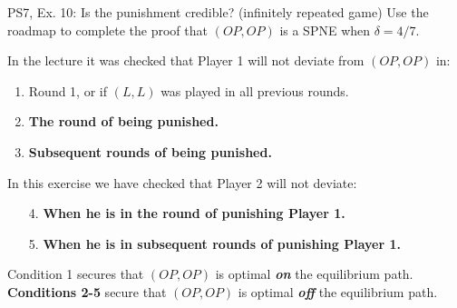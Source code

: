 \begin{frame}{PS7, Ex. 10: Is the punishment credible? (infinitely repeated game)}
  Use the roadmap to complete the proof that $(OP,OP)$ is a SPNE when $\delta=4/7$.\vspace{-4pt}
  \begin{multicols}{2}
    In the lecture it was checked that Player 1 will not deviate from $(OP,OP)$ in:
    \begin{enumerate}
      \item Round 1, or if $(L,L)$ was played in all previous rounds.
      \item \textbf{The  round of being punished.}
      \item \textbf{Subsequent rounds of being punished.}
    \end{enumerate}
    In this exercise we have checked that Player 2 will not deviate:
    \begin{itemize}
      \item[4.] \textbf{When he is in the  round of punishing Player 1.}
      \item[5.] \textbf{When he is in subsequent rounds of punishing Player 1.}
    \end{itemize}
    \vfill\null\columnbreak
    Condition 1 secures that $(OP,OP)$ is optimal \textbf{\textit{on}} the equilibrium path.\\\medskip
    \textbf{Conditions 2-5} secure that $(OP,OP)$ is optimal \textbf{\textit{off}} the equilibrium path.
    \vfill\null
  \end{multicols}
  \vfill\null
\end{frame}
